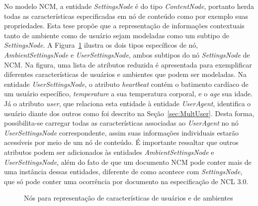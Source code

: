 No modelo NCM, a entidade \textit{SettingsNode} é do tipo \textit{ContentNode}, portanto herda todas as características especificadas em nó de conteúdo como por exemplo suas propriedades. %
Esta tese propõe que a representação de informações contextuais tanto de ambiente como de usuário sejam modeladas como um subtipo de \textit{SettingsNode}.  %
A Figura~\ref{fig:node_settings} ilustra os dois tipos específicos de nó, \textit{AmbientSettingsNode} e \textit{UserSettingsNode}, ambos subtipos do nó \textit{SettingsNode} de NCM. Na figura, uma lista de atributos reduzida é apresentada para exemplificar diferentes características de usuários e ambientes que podem ser modeladas. Na entidade \textit{UserSettingsNode}, o atributo \textit{heartbeat} contém o batimento cardíaco de um usuário específico, \textit{temperature} a sua temperatura corporal, e o \textit{age} sua idade. Já o atributo \textit{user}, que relaciona esta entidade à entidade \textit{UserAgent}, identifica o usuário diante dos outros como foi descrito na Seção~\ref{sec:MultUser}. Desta forma, possibilita-se carregar todas as características  associadas ao \textit{UserAgent} no nó \textit{UserSettingsNode} correspondente, assim suas informações individuais estarão acessíveis por meio de um nó de conteúdo. É importante ressaltar que outros atributos podem ser adicionados às entidades \textit{AmbientSettingsNode} e \textit{UserSettingsNode}, além do fato de que um documento NCM pode conter mais de uma instância dessas entidades, diferente de como acontece com \textit{SettingsNode}, que só pode conter uma ocorrência por documento na especificação de NCL 3.0. 

\begin{figure}[h!]
\centering
{}
\caption{Nós para representação de características de usuários e de ambientes}
\label{fig:node_settings}
\end{figure}

